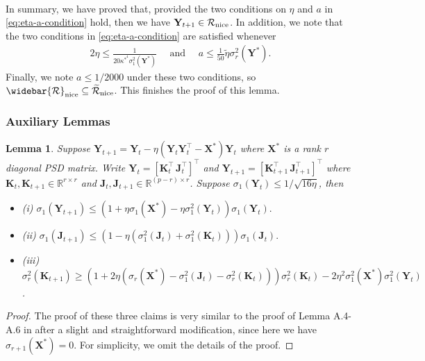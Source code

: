 \documentclass[11pt]{article}
\newtheorem{Lemma}{Lemma}
\newcommand{\bbR}{\mathbb{R}}
\newcommand{\0}{{\mathbf{0}}}
\newcommand{\1}{{\mathbf{1}}}
\newcommand{\X}{{\mathbf{X}}}
\newcommand{\K}{{\mathbf{K}}}
\newcommand{\J}{{\mathbf{J}}}
\newcommand{\Y}{{\mathbf{Y}}}
\newcommand{\cR}{{\cal R}}
\begin{document}
{\begin{equation*}
\begin{split}
	\end{split}
\end{equation*} In summary, we have proved that, provided the two conditions on $\eta$ and $a$ in \eqref{eq:eta-a-condition} hold, then we have ${\Y}_{t+1} \in \cR_{\text{nice}}$. In addition, we note that the two conditions in \eqref{eq:eta-a-condition} are satisfied whenever 
\begin{equation*}
	\begin{split}
		2\eta \leq \frac{1}{20 \kappa^{*^4} \sigma^2_1(\Y^*) } \quad \text{ and }\quad a \leq \frac{1}{50} \tilde{\eta} \sigma_r^2(\Y^*).
	\end{split}
\end{equation*} Finally, we note $a \leq 1/2000$ under these two conditions, so $\widebar{\cR}_{\text{nice}} \subseteq \widetilde{\cR}_{\text{nice}}$. This finishes the proof of this lemma.




\subsubsection{Auxiliary Lemmas} \label{proof:sec-app-add-lemma}

\begin{Lemma}\label{lm:iterate-control}
	Suppose ${\Y}_{t+1} = \Y_{t} - \eta (\Y_{t} \Y_{t}^{\top} - \X^*)\Y_{t}$ where $\X^*$ is a rank $r$ diagonal PSD matrix.  Write $\Y_t = [\K_t^\top \, \J_t^{\top}]^{\top}$ and $\Y_{t+1} = [\K_{t+1}^\top \, \J_{t+1}^{\top}]^{\top}$ where $\K_t, \K_{t+1} \in \bbR^{r \times r}$ and $ \J_t, \J_{t+1}  \in \bbR^{(p-r) \times r}$. Suppose $\sigma_1(\Y_t) \leq 1/\sqrt{16\eta}$, then 
	\begin{itemize}
		\item (i) $\sigma_1(\Y_{t+1}) \leq (1 + \eta \sigma_1(\X^*) - \eta \sigma^2_1(\Y_t) ) \sigma_1(\Y_t).$
		\item (ii) $\sigma_1(\J_{t+1}) \leq \left(1 - \eta (\sigma^2_1(\J_t) + \sigma^2_1(\K_t)) \right) \sigma_1(\J_t).$
		\item (iii) $\sigma^2_{r}(\K_{t+1}) \geq \left(1 + 2 \eta(\sigma_r(\X^*) - \sigma^2_1(\J_t) - \sigma^2_r(\K_t) ) \right) \sigma_r^2(\K_t) - 2 \eta^2 \sigma^2_1(\X^*) \sigma^2_1(\Y_t)$.
	\end{itemize}
\end{Lemma}
\begin{proof}
	The proof of these three claims is very similar to the proof of Lemma A.4-A.6 in \cite{chen2023fast} after a slight and straightforward modification, since here we have $\sigma_{r+1}(\X^*) = 0$. For simplicity, we omit the details of the proof. 
\end{proof}



}
\end{document}
